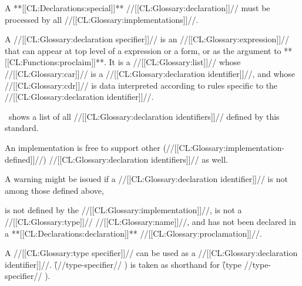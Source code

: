 A **[[CL:Declarations:special]]** //[[CL:Glossary:declaration]]// must be processed by all //[[CL:Glossary:implementations]]//.

\endSubsection%


A //[[CL:Glossary:declaration specifier]]// is an //[[CL:Glossary:expression]]// that can appear at
top level of a  expression or a  form, or as 
the argument to **[[CL:Functions:proclaim]]**.
It is a //[[CL:Glossary:list]]// whose //[[CL:Glossary:car]]// is a //[[CL:Glossary:declaration identifier]]//,
and whose //[[CL:Glossary:cdr]]// is data interpreted according to rules specific to
the //[[CL:Glossary:declaration identifier]]//.

\endSubsection%


\Thenextfigure\ shows a list of all 
//[[CL:Glossary:declaration identifiers]]// 
defined by this standard.





An implementation is free to support other (//[[CL:Glossary:implementation-defined]]//)
//[[CL:Glossary:declaration identifiers]]// as well.  



A warning might be issued
if a //[[CL:Glossary:declaration identifier]]// 
is not among those defined above,

is not defined by the //[[CL:Glossary:implementation]]//,
is not a //[[CL:Glossary:type]]// //[[CL:Glossary:name]]//, 
and has not been declared in a **[[CL:Declarations:declaration]]** //[[CL:Glossary:proclamation]]//.












A //[[CL:Glossary:type specifier]]// can be used as a //[[CL:Glossary:declaration identifier]]//.
\f{(//type-specifier// )} is taken as shorthand for
\f{(type //type-specifier// )}.

